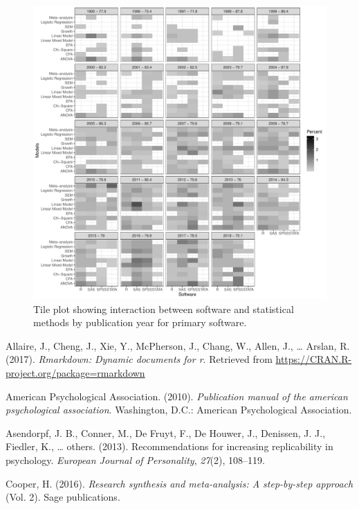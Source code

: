 \documentclass[english,,man]{apa6}
\begin{document}
\begin{figure}
\centering
\includegraphics{software_files/figure-latex/software-statmethods-year-1.pdf}
\caption{\label{fig:software-statmethods-year}Tile plot showing interaction between software and statistical methods by publication year for primary software.}
\end{figure}

\hypertarget{refs}{}
\leavevmode\hypertarget{ref-rmarkdown}{}%
Allaire, J., Cheng, J., Xie, Y., McPherson, J., Chang, W., Allen, J., \ldots{} Arslan, R. (2017). \emph{Rmarkdown: Dynamic documents for r}. Retrieved from \url{https://CRAN.R-project.org/package=rmarkdown}

\leavevmode\hypertarget{ref-apa}{}%
American Psychological Association. (2010). \emph{Publication manual of the american psychological association}. Washington, D.C.: American Psychological Association.

\leavevmode\hypertarget{ref-asendorpf2013}{}%
Asendorpf, J. B., Conner, M., De Fruyt, F., De Houwer, J., Denissen, J. J., Fiedler, K., \ldots{} others. (2013). Recommendations for increasing replicability in psychology. \emph{European Journal of Personality}, \emph{27}(2), 108--119.

\leavevmode\hypertarget{ref-cooper2016}{}%
Cooper, H. (2016). \emph{Research synthesis and meta-analysis: A step-by-step approach} (Vol. 2). Sage publications.
\end{document}
